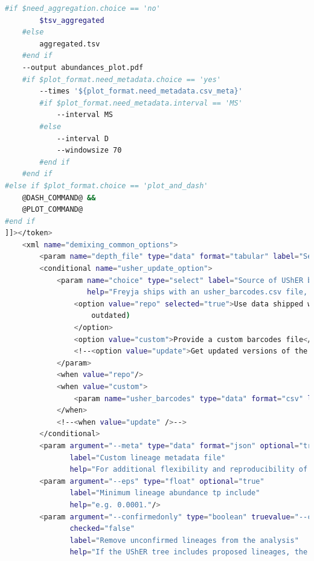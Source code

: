 \begin{lstlisting}[language=bash, caption=macros for collection of related Freyja tool wrappers, label=list:methods:wrapper-freyja-macros]
    #if $need_aggregation.choice == 'no'
        $tsv_aggregated
    #else
        aggregated.tsv
    #end if
    --output abundances_plot.pdf
    #if $plot_format.need_metadata.choice == 'yes'
        --times '${plot_format.need_metadata.csv_meta}'
        #if $plot_format.need_metadata.interval == 'MS'
            --interval MS
        #else
            --interval D
            --windowsize 70
        #end if
    #end if
#else if $plot_format.choice == 'plot_and_dash'
    @DASH_COMMAND@ &&
    @PLOT_COMMAND@
#end if
]]></token>
    <xml name="demixing_common_options">
        <param name="depth_file" type="data" format="tabular" label="Sequencing depth file"/>
        <conditional name="usher_update_option">
            <param name="choice" type="select" label="Source of UShER barcodes data"
                   help="Freyja ships with an usher_barcodes.csv file, which the tool can access internally. Since this file gets updated rather frequently, you can also download the latest version of the file from https://github.com/andersen-lab/Freyja/raw/main/freyja/data/usher_barcodes.csv, set the dataset's datatype to csv and use it as a custom barcodes file.">
                <option value="repo" selected="true">Use data shipped with the tool (can be
                    outdated)
                </option>
                <option value="custom">Provide a custom barcodes file</option>
                <!--<option value="update">Get updated versions of the curated lineage file as well as the UShER global phylogenetic tree (can cause tool to run slowly)</option>-->
            </param>
            <when value="repo"/>
            <when value="custom">
                <param name="usher_barcodes" type="data" format="csv" label="UShER barcodes file"/>
            </when>
            <!--<when value="update" />-->
        </conditional>
        <param argument="--meta" type="data" format="json" optional="true"
               label="Custom lineage metadata file"
               help="For additional flexibility and reproducibility of analyses, a custom lineage-to-contellation mapping metadata file can be provided."/>
        <param argument="--eps" type="float" optional="true"
               label="Minimum lineage abundance tp include"
               help="e.g. 0.0001."/>
        <param argument="--confirmedonly" type="boolean" truevalue="--confirmedonly" falsevalue=""
               checked="false"
               label="Remove unconfirmed lineages from the analysis"
               help="If the UShER tree includes proposed lineages, the --confirmedonly flag removes unconfirmed lineages from the analysis."/>

\end{lstlisting}
